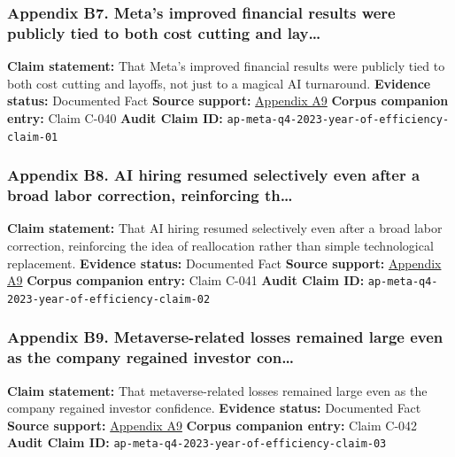 \documentclass[
  american,
  11pt,
  letterpaper,
]{article}
\begin{document}
\subsubsection{Appendix B7. Meta's improved financial results were
publicly tied to both cost cutting and
lay\ldots{}}\label{appendix-b7-meta-s-improved-financial-results-were-publicly-tied-to-both-cost-cutting-and-lay}

\textbf{Claim statement:} That Meta's improved financial results were
publicly tied to both cost cutting and layoffs, not just to a magical AI
turnaround. \textbf{Evidence status:} Documented Fact \textbf{Source
support:}
\hyperref[appendix-a9-meta-posts-sharp-profit-revenue-increase-in-q4-thanks-to-cost-cuts-and-advertising-rebound]{Appendix
A9} \textbf{Corpus companion entry:} Claim C-040 \textbf{Audit Claim
ID:} \texttt{ap-meta-q4-2023-year-of-efficiency-claim-01}

\subsubsection{Appendix B8. AI hiring resumed selectively even after a
broad labor correction, reinforcing
th\ldots{}}\label{appendix-b8-ai-hiring-resumed-selectively-even-after-a-broad-labor-correction-reinforcing-th}

\textbf{Claim statement:} That AI hiring resumed selectively even after
a broad labor correction, reinforcing the idea of reallocation rather
than simple technological replacement. \textbf{Evidence status:}
Documented Fact \textbf{Source support:}
\hyperref[appendix-a9-meta-posts-sharp-profit-revenue-increase-in-q4-thanks-to-cost-cuts-and-advertising-rebound]{Appendix
A9} \textbf{Corpus companion entry:} Claim C-041 \textbf{Audit Claim
ID:} \texttt{ap-meta-q4-2023-year-of-efficiency-claim-02}

\subsubsection{Appendix B9. Metaverse-related losses remained large even
as the company regained investor
con\ldots{}}\label{appendix-b9-metaverse-related-losses-remained-large-even-as-the-company-regained-investor-con}

\textbf{Claim statement:} That metaverse-related losses remained large
even as the company regained investor confidence. \textbf{Evidence
status:} Documented Fact \textbf{Source support:}
\hyperref[appendix-a9-meta-posts-sharp-profit-revenue-increase-in-q4-thanks-to-cost-cuts-and-advertising-rebound]{Appendix
A9} \textbf{Corpus companion entry:} Claim C-042 \textbf{Audit Claim
ID:} \texttt{ap-meta-q4-2023-year-of-efficiency-claim-03}
\end{document}
